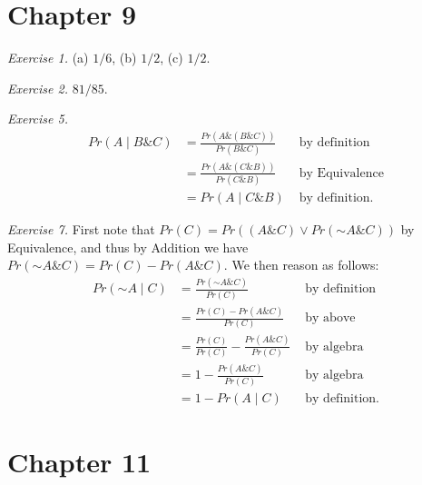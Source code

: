 \documentclass[justified]{tufte-book}
\newcommand{\given}{\mid}
\renewcommand{\neg}{\mathbin{\sim}}
\renewcommand{\wedge}{\mathbin{\&}}
\newcommand{\p}{Pr}
\begin{document}
\hypertarget{chapter-9}{%
\section*{Chapter 9}\label{chapter-9}}

\noindent
\emph{Exercise 1.} (a) \(1/6\), (b) \(1/2\), (c) \(1/2\).

\vspace{.5em}

\noindent
\emph{Exercise 2.} \(81/85\).

\vspace{.5em}

\noindent
\emph{Exercise 5.}
\[
  \begin{aligned}
    \p(A \given B \wedge C) 
      &= \frac{\p(A \wedge (B \wedge C))}{\p(B \wedge C)} & \text{ by definition}\\
      &= \frac{\p(A \wedge (C \wedge B))}{\p(C \wedge B)} & \text{ by Equivalence}\\
      &= \p(A \given C \wedge B)                          & \text{ by definition.}
  \end{aligned}
  \]

\vspace{.5em}

\noindent
\emph{Exercise 7.} First note that \(\p(C) = \p((A \wedge C) \vee \p(\neg A \wedge C))\) by Equivalence, and thus by Addition we have \(\p(\neg A \wedge C) = \p(C) - \p(A \wedge C)\). We then reason as follows:
\[
  \begin{aligned}
    \p(\neg A \given C) 
      &= \frac{\p(\neg A \wedge C)}{\p(C)}                  & \text{ by definition}\\
      &= \frac{\p(C) - \p(A \wedge C)}{\p(C)}               & \text{ by above}\\
      &= \frac{\p(C)}{\p(C)} - \frac{\p(A \wedge C)}{\p(C)} & \text{ by algebra}\\
      &= 1 - \frac{\p(A \wedge C)}{\p(C)}                   & \text{ by algebra}\\
      &= 1 - \p(A \given C)                                 & \text{ by definition.}
  \end{aligned}
  \]

\hypertarget{chapter-11}{%
\section*{Chapter 11}\label{chapter-11}}
\end{document}
